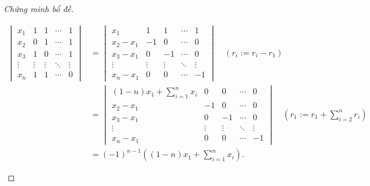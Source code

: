 \documentclass[class=linearalgebra,crop=false]{standalone}
\begin{document}
\begin{proof}[Chứng minh bổ đề]
\begin{enumerate}[label = (\roman*)]
              \begingroup
              \allowdisplaybreaks
              \begin{align*}
                  \begin{vmatrix}
                      x_{1}  & 1      & 1      & \cdots & 1      \\
                      x_{2}  & 0      & 1      & \cdots & 1      \\
                      x_{3}  & 1      & 0      & \cdots & 1      \\
                      \vdots & \vdots & \vdots & \ddots & \vdots \\
                      x_{n}  & 1      & 1      & \cdots & 0
                  \end{vmatrix}
                   & =
                  \begin{vmatrix}
                      x_{1}         & 1      & 1      & \cdots & 1      \\
                      x_{2} - x_{1} & -1     & 0      & \cdots & 0      \\
                      x_{3} - x_{1} & 0      & -1     & \cdots & 0      \\
                      \vdots        & \vdots & \vdots & \ddots & \vdots \\
                      x_{n} - x_{1} & 0      & 0      & \cdots & -1
                  \end{vmatrix}\quad(r_{i} := r_{i} - r_{1})                                 \\
                   & =
                  \begin{vmatrix}
                      (1-n)x_{1} + \displaystyle\sum^{n}_{i=1}x_{i} & 0      & 0      & \cdots & 0      \\
                      x_{2} - x_{1}                                 & -1     & 0      & \cdots & 0      \\
                      x_{3} - x_{1}                                 & 0      & -1     & \cdots & 0      \\
                      \vdots                                        & \vdots & \vdots & \ddots & \vdots \\
                      x_{n} - x_{1}                                 & 0      & 0      & \cdots & -1
                  \end{vmatrix}\quad(r_{1}:= r_{1} + \sum^{n}_{i=2}r_{i}) \\
                   & = (-1)^{n-1}\left((1-n)x_{1} + \sum^{n}_{i=1}x_{i}\right).
              \end{align*}
              \endgroup


\end{enumerate}
\end{proof}
\end{document}
